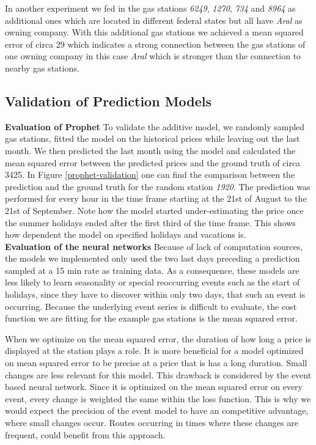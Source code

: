 \documentclass[%
a4paper,
DIV12,
2.5headlines,
bigheadings,
titlepage,
openbib,
]{scrartcl}
\begin{document}
In another experiment we fed in the gas stations \textit{6249}, \textit{1270}, \textit{734} and \textit{8964} as additional ones which are located in different federal states but all have \textit{Aral} as owning company. %
With this additional gas stations we achieved a mean squared error of circa 29 which indicates a strong connection between the gas stations of one owning company in this case \textit{Aral} which is stronger than the connection to nearby gas stations.

\subsection{Validation of Prediction
Models}\label{validation-of-prediction-models}

\textbf{Evaluation of Prophet} To validate the additive model, we randomly sampled gas stations, fitted the model on the historical prices while leaving out the last month.
We then predicted the last month using the model and calculated the mean squared error between the predicted prices and the ground truth of circa 3425.
In Figure \ref{prophet-validation} one can find the comparison between the prediction and the ground truth for the random station \textit{1920}.
The prediction was performed for every hour in the time frame starting at the 21st of August to the 21st of September.
Note how the model started under-estimating the price once the summer holidays ended after the first third of the time frame.
This shows how dependent the model on specified holidays and vacations is.\\

\textbf{Evaluation of the neural networks}
Because of lack of computation sources, the models we implemented only used the two last days preceding a prediction sampled at a 15 min rate as training data.
As a consequence, these models are less likely to learn seasonality or special reoccurring events such as the start of holidays, since they have to discover within only two days, that such an event is occurring.
Because the underlying event series is difficult to evaluate, the cost function we are fitting for the example gas stations is the mean squared error.

When we optimize on the mean squared error, the duration of how long a price is displayed at the station plays a role. 
It is more beneficial for a model optimized on mean squared error to be precise at a price that is has a long duration.
Small changes are less relevant for this model.
This drawback is considered by the event based neural network.
Since it is optimized on the mean squared error on every event, every change is weighted the same within the loss function.
This is why we would expect the precision of the event model to  have an competitive advantage, where small changes occur.
Routes occurring in times where these changes are frequent, could benefit from this approach.
\end{document}
